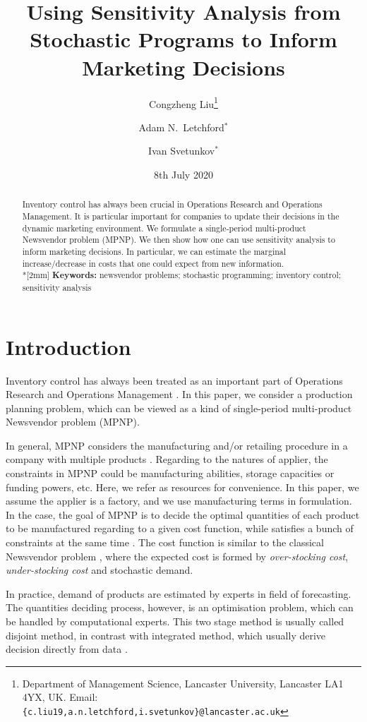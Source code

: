 \documentclass[a4paper,11pt]{article}
\title{Using Sensitivity Analysis from Stochastic Programs to Inform Marketing Decisions}
\author{Congzheng Liu\thanks{Department of Management Science,
Lancaster University, Lancaster LA1 4YX, UK.
Email: {\tt \{c.liu19,a.n.letchford,i.svetunkov\}@lancaster.ac.uk}}
\and Adam N.\ Letchford$^*$ \and Ivan Svetunkov$^*$} %
\date{8th July 2020}
\begin{document}
\maketitle

\begin{abstract}
Inventory control has always been crucial in Operations Research and Operations Management. It is particular important for companies to update their decisions in the dynamic marketing environment. 
We formulate a single-period multi-product Newsvendor problem (MPNP). We then show how one can use sensitivity analysis to inform marketing decisions. In particular, we can estimate the marginal increase/decrease in
costs that one could expect from new information.
\\*[2mm]
{\bf Keywords:} newsvendor problems; stochastic programming; inventory control; sensitivity analysis
\end{abstract}

\section{Introduction}
Inventory control has always been treated as an important part of Operations Research and Operations Management \cite{Po02,SPP98,Zi00}. In this paper, we consider a production planning problem, which can be viewed as a kind of single-period multi-product
Newsvendor problem (MPNP)\cite{D98,TTV12}.

In general, MPNP considers the manufacturing and/or retailing procedure in a company with multiple products \cite{SPP98}. Regarding to the natures of applier, the constraints in MPNP could be manufacturing abilities, storage capacities or funding powers, etc. Here, we refer as resources for convenience. In this paper, we assume the applier is a factory, and we use manufacturing terms in formulation. In the case, the goal of MPNP is to decide the optimal quantities of each product to be manufactured regarding to a given cost function, while satisfies a bunch of constraints at the same time \cite{BDR12}. The cost function is similar to the classical Newsvendor problem \cite{Ch12}, where the expected cost is formed by \emph{over-stocking cost}, \emph{under-stocking cost} and stochastic demand.

In practice, demand of products are estimated by experts in field of forecasting. The quantities deciding process, however, is an optimisation problem, which can be handled by computational experts. This two stage method is usually called disjoint method, in contrast with integrated method, which usually derive decision directly from data \cite{Sc58}. 
\end{document}
